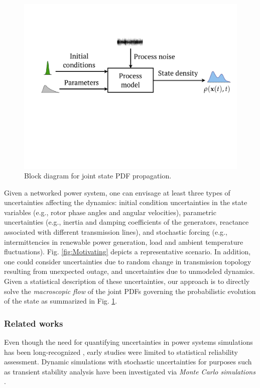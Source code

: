 \documentclass[10pt,twocolumn]{IEEEtran}
\begin{document}
\begin{figure}
\centering
\includegraphics[width=0.9\linewidth]{UncPropBlockDiagm.pdf}
\caption{\small{Block diagram for joint state PDF propagation.}}
\label{fig:UncertaintyPropagation}
\end{figure}

Given a networked power system, one can envisage at least three types of uncertainties affecting the dynamics: initial condition uncertainties in the state variables (e.g., rotor phase angles and angular velocities), parametric uncertainties (e.g., inertia and damping coefficients of the generators, reactance associated with different transmission lines), and stochastic forcing (e.g., intermittencies in renewable power generation, load and ambient temperature fluctuations). Fig. \ref{fig:Motivating} depicts a representative scenario. In addition, one could consider uncertainties due to random change in transmission topology resulting from unexpected outage, and uncertainties due to unmodeled dynamics. Given a statistical description of these uncertainties, our approach is to directly solve the \emph{macroscopic flow} of the joint PDFs governing the probabilistic evolution of the state as summarized in Fig. \ref{fig:UncertaintyPropagation}.


\subsubsection{Related works}
Even though the need for quantifying uncertainties in power systems simulations has been long-recognized \cite{allan8791,allan9296}, early studies were limited to statistical reliability assessment. Dynamic simulations with stochastic uncertainties for purposes such as transient stability analysis have been investigated via \emph{Monte Carlo simulations} \cite{timko1983monte,dong2012numerical,perninge2012importance,odun2012structure}.
\end{document}
